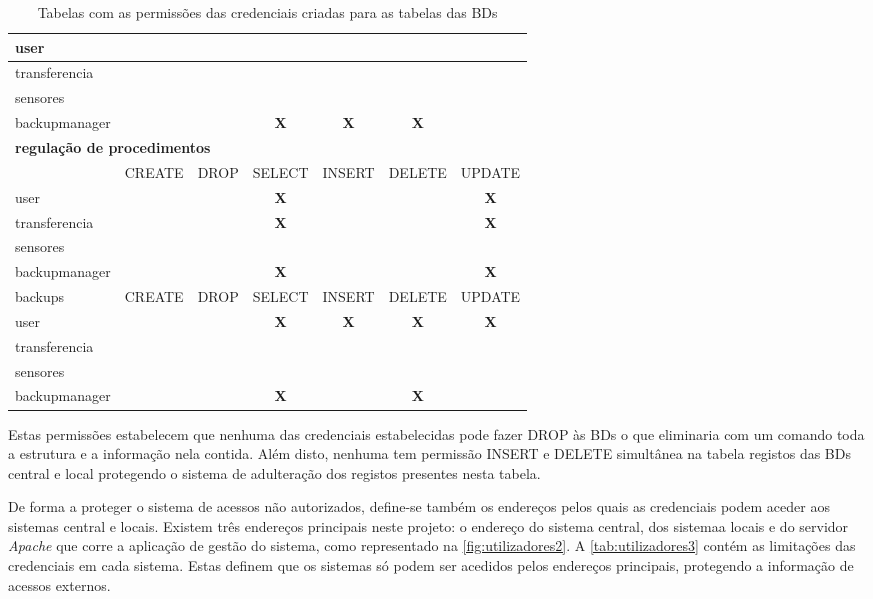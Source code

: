 \documentclass[11pt,twoside,a4paper]{report}
\begin{document}
\begin{table}
\begin{tabular}{|l|c|c|c|c|c|c|}
		user & & & & & & \\ \hline
		transferencia & & & & & & \\ \hline
		sensores & & & & & & \\ \hline
		backupmanager & & & \textbf{X} & \textbf{X} & \textbf{X} & \\ \hline
		\multicolumn{7}{l}{\textbf{regulação de procedimentos}} \\ \hline
		\makecell{atualizar} & CREATE & DROP & SELECT & INSERT & DELETE & UPDATE \\ \hline
		user & & & \textbf{X} & & & \textbf{X} \\ \hline
		transferencia & & & \textbf{X} & & & \textbf{X} \\ \hline
		sensores & & & & & & \\ \hline
		backupmanager & & & \textbf{X} & & & \textbf{X} \\ \hline
		backups & CREATE & DROP & SELECT & INSERT & DELETE & UPDATE \\ \hline
		user & & & \textbf{X} & \textbf{X} & \textbf{X} & \textbf{X} \\ \hline
		transferencia & & & & & & \\ \hline
		sensores & & & & & & \\ \hline
		backupmanager & & & \textbf{X} & & \textbf{X} & \\ \hline
	\end{tabular}
	\caption[Tabelas com as permissões das credenciais criadas para as tabelas das bases de dados]{Tabelas com as permissões das credenciais criadas para as tabelas das BDs}
	\label{tab:utilizadores1}
\end{table}
Estas permissões estabelecem que nenhuma das credenciais estabelecidas pode fazer DROP às BDs o que eliminaria com um comando toda a estrutura e a informação nela contida. Além disto, nenhuma tem permissão INSERT e DELETE simultânea na tabela registos das BDs central e local protegendo o sistema de adulteração dos registos presentes nesta tabela.\par 
De forma a proteger o sistema de acessos não autorizados, define-se também os endereços pelos quais as credenciais podem aceder aos sistemas central e locais. Existem três endereços principais neste projeto: o endereço do sistema central, dos sistemaa locais e do servidor \textit{Apache} que corre a aplicação de gestão do sistema, como representado na \autoref{fig:utilizadores2}. A \autoref{tab:utilizadores3} contém as limitações das credenciais em cada sistema. Estas definem que os sistemas só podem ser acedidos pelos endereços principais, protegendo a informação de acessos externos.
\end{document}
